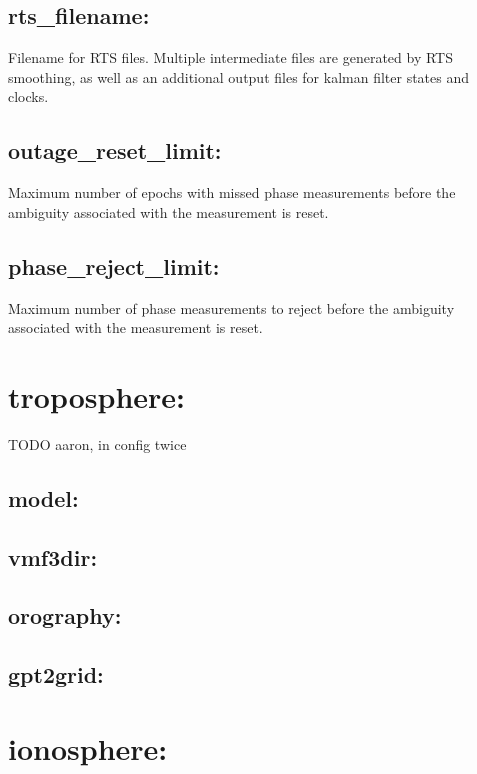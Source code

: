 \subsection{rts\_filename:}
Filename for RTS files. Multiple intermediate files are generated by RTS smoothing, as well as an additional output files for kalman filter states and clocks.

\subsection{outage\_reset\_limit:}
Maximum number of epochs with missed phase measurements before the ambiguity associated with the measurement is reset.

\subsection{phase\_reject\_limit:}
Maximum number of phase measurements to reject before the ambiguity associated with the measurement is reset.








\section{troposphere:}	TODO aaron, in config twice

\subsection{model:}

\subsection{vmf3dir:}

\subsection{orography:}

\subsection{gpt2grid:}




\section{ionosphere:}

